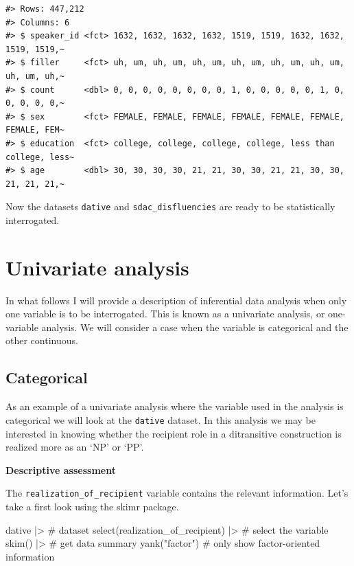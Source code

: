 \documentclass[
  letterpaper,
]{latex/krantz}
\newenvironment{Shaded}{\begin{snugshade}}{\end{snugshade}}
\newcommand{\CommentTok}[1]{\textcolor[rgb]{0.37,0.37,0.37}{#1}}
\newcommand{\FunctionTok}[1]{\textcolor[rgb]{0.28,0.35,0.67}{#1}}
\newcommand{\NormalTok}[1]{\textcolor[rgb]{0.00,0.23,0.31}{#1}}
\newcommand{\SpecialCharTok}[1]{\textcolor[rgb]{0.37,0.37,0.37}{#1}}
\newcommand{\StringTok}[1]{\textcolor[rgb]{0.13,0.47,0.30}{#1}}
\begin{document}
\begin{verbatim}
#> Rows: 447,212
#> Columns: 6
#> $ speaker_id <fct> 1632, 1632, 1632, 1632, 1519, 1519, 1632, 1632, 1519, 1519,~
#> $ filler     <fct> uh, um, uh, um, uh, um, uh, um, uh, um, uh, um, uh, um, uh,~
#> $ count      <dbl> 0, 0, 0, 0, 0, 0, 0, 0, 1, 0, 0, 0, 0, 0, 1, 0, 0, 0, 0, 0,~
#> $ sex        <fct> FEMALE, FEMALE, FEMALE, FEMALE, FEMALE, FEMALE, FEMALE, FEM~
#> $ education  <fct> college, college, college, college, less than college, less~
#> $ age        <dbl> 30, 30, 30, 30, 21, 21, 30, 30, 21, 21, 30, 30, 21, 21, 21,~
\end{verbatim}

Now the datasets \texttt{dative} and \texttt{sdac\_disfluencies} are
ready to be statistically interrogated.

\hypertarget{univariate-analysis}{%
\section{Univariate analysis}\label{univariate-analysis}}

In what follows I will provide a description of inferential data
analysis when only one variable is to be interrogated. This is known as
a univariate analysis, or one-variable analysis. We will consider a case
when the variable is categorical and the other continuous.

\hypertarget{categorical}{%
\subsection{Categorical}\label{categorical}}

As an example of a univariate analysis where the variable used in the
analysis is categorical we will look at the \texttt{dative} dataset. In
this analysis we may be interested in knowing whether the recipient role
in a ditransitive construction is realized more as an `NP' or `PP'.

\textbf{Descriptive assessment}

The \texttt{realization\_of\_recipient} variable contains the relevant
information. Let's take a first look using the skimr package.

\begin{Shaded}
\begin{Highlighting}[]
\NormalTok{dative }\SpecialCharTok{|\textgreater{}} \CommentTok{\# dataset}
  \FunctionTok{select}\NormalTok{(realization\_of\_recipient) }\SpecialCharTok{|\textgreater{}} \CommentTok{\# select the variable}
  \FunctionTok{skim}\NormalTok{() }\SpecialCharTok{|\textgreater{}} \CommentTok{\# get data summary}
  \FunctionTok{yank}\NormalTok{(}\StringTok{"factor"}\NormalTok{) }\CommentTok{\# only show factor{-}oriented information}
\end{Highlighting}
\end{Shaded}
\end{document}
